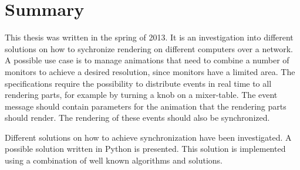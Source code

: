 \chapter{Summary}

This thesis was written in the spring of 2013. It is an investigation into different solutions on how to sychronize rendering on different computers over a network. A possible use case is to manage animations that need to combine a number of monitors to achieve a desired resolution, since monitors have a limited area. The specifications require the possibility to distribute events in real time to all rendering parts, for example by turning a knob on a mixer-table. The event message should contain parameters for the animation that the rendering parts should render. The rendering of these events should also be synchronized. 

Different solutions on how to achieve synchronization have been investigated. A possible solution written in Python is presented. This solution is implemented using a combination of well known algorithms and solutions. 
